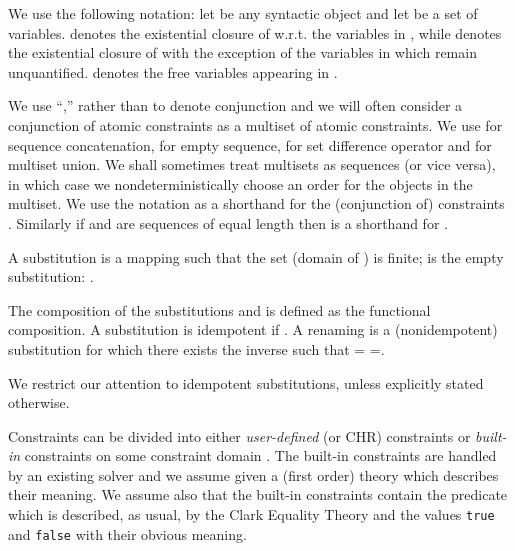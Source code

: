 \documentclass{tlp}
\begin{document}
We use the following notation: let  be any syntactic object and let  be a set of variables.
 denotes the
existential closure of  w.r.t. the variables in , while  denotes the existential closure of  with the exception of the variables in  which remain unquantified.  denotes the free variables appearing in .


We use ``,'' rather than  to denote conjunction
and we will often consider a conjunction of atomic constraints as
a multiset of atomic constraints.
We use  for sequence concatenation,  for empty sequence,  for set difference operator and  for multiset union. We shall sometimes treat multisets as sequences (or vice versa), in which case we nondeterministically choose an order for the objects in the multiset. We use the notation
 as a shorthand for the (conjunction of) constraints
. Similarly if  and  are sequences of equal length then  is a shorthand for .

A substitution is a mapping  such that the set  (domain of ) is finite;
 is the empty substitution: .

The composition  of the substitutions 
and  is defined as the functional composition. A substitution
 is idempotent if
.
A renaming is a (nonidempotent) substitution  for which there exists the inverse 
such that  =  =.


We restrict our attention to idempotent substitutions, unless explicitly stated otherwise.



Constraints can be divided into either {\em user-defined} (or CHR) constraints or {\em built-in} constraints on some constraint domain . The built-in constraints are handled by an existing solver and we assume
given a (first order) theory  which describes their meaning.
We assume also that the built-in constraints contain the predicate  which is described,
as usual, by the Clark Equality Theory \cite{Llo84} and the values
\texttt{true} and \texttt{false} with their obvious meaning.
\end{document}
